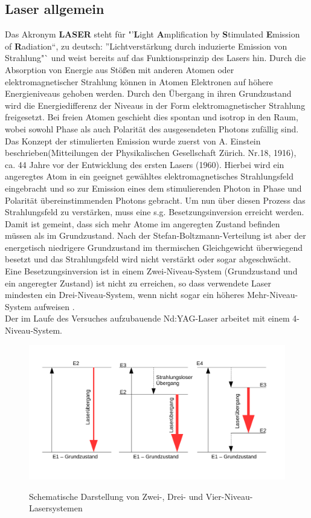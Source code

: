 \documentclass[twoside,colorback,accentcolor=tud4c,11pt]{tudreport}
\begin{document}
\subsection{Laser allgemein}
Das Akronym  \textbf{LASER} steht für "'\textbf{L}ight \textbf{A}mplification by \textbf{S}timulated \textbf{E}mission of \textbf{R}adiation"`, zu deutsch: "'Lichtverstärkung durch induzierte Emission von Strahlung"` und weist bereits auf das Funktionsprinzip des Lasers hin. Durch die Absorption von Energie aus Stößen mit anderen Atomen oder elektromagnetischer Strahlung können in Atomen Elektronen auf höhere Energieniveaus gehoben werden. Durch den Übergang in ihren Grundzustand wird die Energiedifferenz der Niveaus in der Form elektromagnetischer Strahlung freigesetzt. Bei freien Atomen geschieht dies spontan und isotrop in den Raum, wobei sowohl Phase als auch Polarität des ausgesendeten Photons zufällig sind.\\
Das Konzept der stimulierten Emission wurde zuerst von A. Einstein beschrieben(Mitteilungen der Physikalischen Gesellschaft Zürich. Nr.18, 1916), ca. 44 Jahre vor der Entwicklung des ersten Lasers (1960). Hierbei wird ein angeregtes Atom in ein geeignet gewähltes elektromagnetisches Strahlungsfeld eingebracht und so zur Emission eines dem stimulierenden Photon in Phase und Polarität übereinstimmenden Photons gebracht. Um nun über diesen Prozess das Strahlungsfeld zu verstärken, muss eine s.g. Besetzungsinversion erreicht werden. Damit ist gemeint, dass sich mehr Atome im angeregten Zustand befinden müssen als im Grundzustand. Nach der Stefan-Boltzmann-Verteilung ist aber der energetisch niedrigere Grundzustand im thermischen Gleichgewicht überwiegend besetzt und das Strahlungsfeld wird nicht verstärkt oder sogar abgeschwächt. Eine Besetzungsinversion ist in einem Zwei-Niveau-System (Grundzustand und ein angeregter Zustand) ist nicht zu erreichen, so dass verwendete Laser mindesten ein Drei-Niveau-System, wenn nicht sogar ein höheres Mehr-Niveau-System aufweisen \cite{1}.\\
Der im Laufe des Versuches aufzubauende Nd:YAG-Laser arbeitet mit einem 4-Niveau-System.
\begin{figure}[H]
\centering
   	\begin{minipage}[b]{0.8\textwidth}
   	\includegraphics[width=\textwidth]{graphics/Lasersys.pdf}
  	\label{lasys}
   	\end{minipage}
\caption{Schematische Darstellung von Zwei-, Drei- und Vier-Niveau-Lasersystemen} 	
\end{figure}
\end{document}
